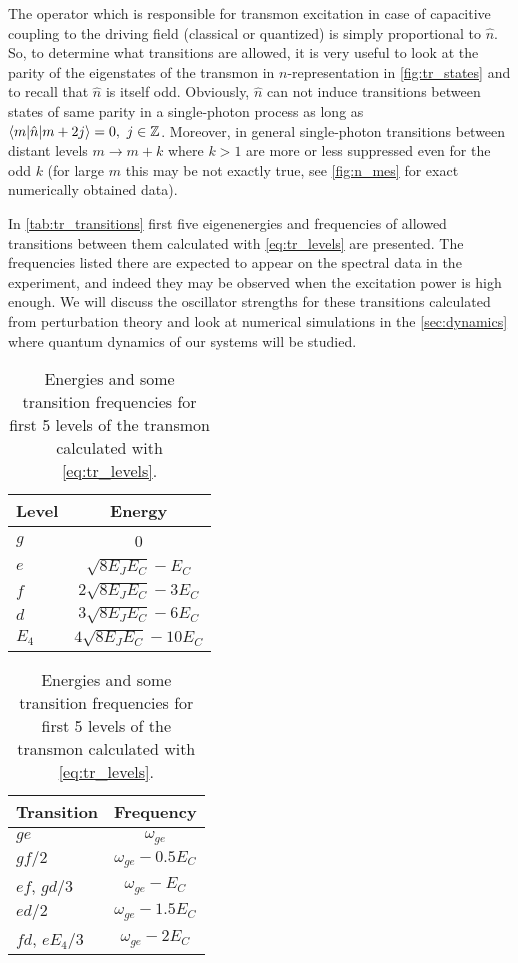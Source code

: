 \documentclass[12pt, twoside]{report}
\DeclarePairedDelimiter\bra{\langle}{\rvert}
\DeclarePairedDelimiter\ket{\lvert}{\rangle}
\numberwithin{equation}{section}
\begin{document}
The operator which is responsible for transmon excitation in case of capacitive coupling to the driving field (classical or quantized) is simply proportional to $\hat n$\cite{Koch2007}. So, to determine what transitions are allowed, it is very useful to look at the parity of the eigenstates of the transmon in $n$-representation in \autoref{fig:tr_states} and to recall that $\hat n$ is itself odd. Obviously, $\hat n$ can not induce transitions between states of same parity in a single-photon process as long as $\bra{m}\hat n\ket{m+2j} = 0,\ j\in\mathbb{Z}$. Moreover, in general single-photon transitions between distant levels $m\rightarrow m+k$ where $k>1$ are more or less suppressed\cite{Bishop2010} even for the odd $k$ (for large $m$ this may be not exactly true, see \autoref{fig:n_mes} for exact numerically obtained data). 

In \autoref{tab:tr_transitions} first five eigenenergies and frequencies of allowed transitions between them calculated with \eqref{eq:tr_levels} are presented. The frequencies listed there are expected to appear on the spectral data in the experiment, and indeed they may be observed when the excitation power is high enough. We will discuss the oscillator strengths for these transitions calculated from perturbation theory and look at numerical simulations in the \autoref{sec:dynamics} where quantum dynamics of our systems will be studied.

\begin{table}
\centering
\begin{tabular}{l|c}
Level & Energy\\
\hline
$g$ & 0\\
$e$ & $\sqrt{8E_J E_C} - E_C$\\
$f$ & $2\sqrt{8E_J E_C} - 3 E_C$\\
$d$ & $3\sqrt{8E_J E_C} - 6 E_C$\\
$E_4$ & $4\sqrt{8E_J E_C} - 10 E_C$\\
\hline
\end{tabular}\quad
\begin{tabular}{l|c}
Transition & Frequency\\
\hline
$ge$ & $\omega_{ge}$ \\
$gf/2$ & $\omega_{ge} - 0.5 E_C$\\
$ef$, $gd/3$& $\omega_{ge}-E_C$\\
$ed/2$ & $\omega_{ge} - 1.5 E_C$\\
$fd$, $e E_4/3$ & $\omega_{ge}-2 E_C$\\
\hline
\end{tabular}
\caption{Energies and some transition frequencies for first 5 levels of the transmon calculated with \eqref{eq:tr_levels}.}
\label{tab:tr_transitions}
\end{table}
\end{document}
